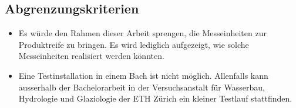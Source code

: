 \subsection{Abgrenzungskriterien}
\begin{itemize}
\item Es würde den Rahmen dieser Arbeit sprengen, die Messeinheiten zur Produktreife zu bringen. Es wird lediglich aufgezeigt, wie solche Messeinheiten realisiert werden könnten.
\item Eine Testinstallation in einem Bach ist nicht möglich. Allenfalls kann ausserhalb der Bachelorarbeit in der Versuchsanstalt für Wasserbau, Hydrologie und Glaziologie der ETH Zürich ein kleiner Testlauf stattfinden.
\end{itemize}

